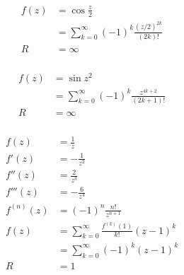 \documentclass{article}
\begin{document}
\setcounter{subsubsection}{8}
\subsubsection{}

\begin{align*}
  f(z) & = \cos \frac{z}{2}                                        \\
       & = \sum_{k = 0}^\infty (-1)^k \frac{(z / 2)^{2 k}}{(2 k)!} \\
  R    & = \infty
\end{align*}

\setcounter{subsubsection}{10}
\subsubsection{}

\begin{align*}
  f(z) & = \sin z^2                                                  \\
       & = \sum_{k = 0}^\infty (-1)^k \frac{z^{4 k + 2}}{(2 k + 1)!} \\
  R    & = \infty
\end{align*}

\setcounter{subsubsection}{12}
\subsubsection{}

\begin{align*}
  f(z)       & = \frac{1}{z}                                          \\
  f'(z)      & = -\frac{1}{z^2}                                       \\
  f''(z)     & = \frac{2}{z^3}                                        \\
  f'''(z)    & = -\frac{6}{z^4}                                       \\
  f^{(n)}(z) & = (-1)^n \frac{n!}{z^{n + 1}}                          \\
  f(z)       & = \sum_{k = 0}^\infty \frac{f^{(k)} (1)}{k!} (z - 1)^k \\
             & = \sum_{k = 0}^\infty (-1)^k (z - 1)^k                 \\
  R          & = 1
\end{align*}

\setcounter{subsubsection}{14}
\subsubsection{}
\end{document}
